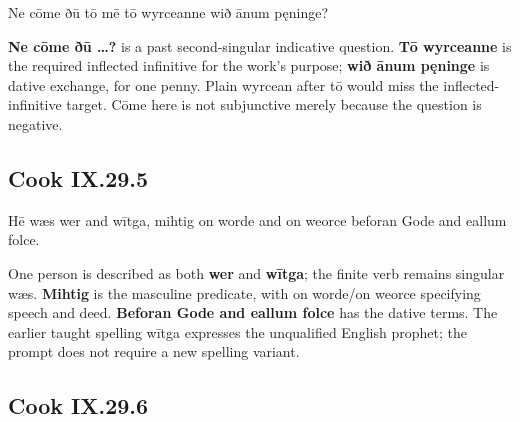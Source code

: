 \par\begin{minipage}{\linewidth}\raggedright
Ne cōme ðū tō mē tō wyrceanne wið ānum pęninge?

\textbf{Ne cōme ðū …?} is a past second-singular indicative question. \textbf{Tō wyrceanne} is the required inflected infinitive for the work’s purpose; \textbf{wið ānum pęninge} is dative exchange, for one penny. Plain wyrcean after tō would miss the inflected-infinitive target. Cōme here is not subjunctive merely because the question is negative.

\end{minipage}\par\addvspace{4pt}

\subsection*{Cook IX.29.5}

\par\begin{minipage}{\linewidth}\raggedright
Hē wæs wer and wītga, mihtig on worde and on weorce beforan Gode and eallum folce.

One person is described as both \textbf{wer} and \textbf{wītga}; the finite verb remains singular wæs. \textbf{Mihtig} is the masculine predicate, with on worde/\allowbreak{}on weorce specifying speech and deed. \textbf{Beforan Gode and eallum folce} has the dative terms. The earlier taught spelling wītga expresses the unqualified English prophet; the prompt does not require a new spelling variant.

\end{minipage}\par\addvspace{4pt}

\subsection*{Cook IX.29.6}

